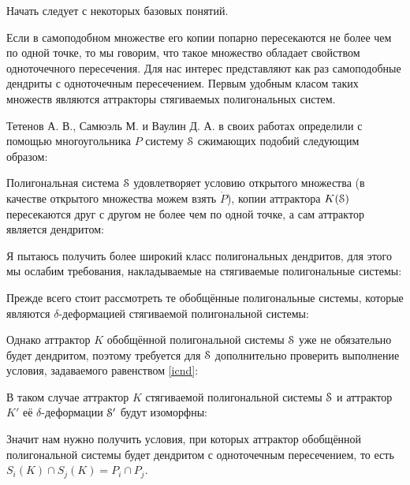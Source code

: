 Начать следует с некоторых базовых понятий.


Если в самоподобном множестве его копии попарно пересекаются не более чем по одной точке, то мы говорим, что такое множество обладает свойством одноточечного пересечения.
Для нас интерес представляют как раз самоподобные дендриты с одноточечным пересечением.
Первым удобным класом таких множеств являются аттракторы стягиваемых полигональных систем.

Тетенов А. В., Самюэль М. и Ваулин Д. А. в своих работах \cite{TSV2017, STV2017} определили с помощью многоугольника $P$ систему ${\EuScript S}$ сжимающих подобий следующим образом:


Полигональная система ${\EuScript S}$ удовлетворяет условию открытого множества (в качестве открытого множества можем взять $\dot P$), копии аттрактора $K({\EuScript S})$ пересекаются друг с другом не более чем по одной точке, а сам аттрактор является дендритом:


Я пытаюсь получить более широкий класс полигональных дендритов, для этого мы ослабим требования, накладываемые на стягиваемые полигональные системы:


Прежде всего стоит рассмотреть те обобщённые полигональные системы, которые являются $\delta$-деформацией стягиваемой полигональной системы:



Однако аттрактор $K$ обобщённой полигональной системы ${\EuScript S}$ уже не обязательно будет дендритом, поэтому требуется для ${\EuScript S}$ дополнительно проверить выполнение условия, задаваемого равенством \eqref{icnd}:


В таком случае аттрактор $K$ стягиваемой полигональной системы ${\EuScript S}$ и аттрактор $K'$ её $\delta$-деформации ${\EuScript S}'$ будут изоморфны:


Значит нам нужно получить условия, при которых аттрактор обобщённой полигональной системы будет дендритом с одноточечным пересечением, то есть $S_i(K)\cap S_j(K)=P_i\cap P_j$.


